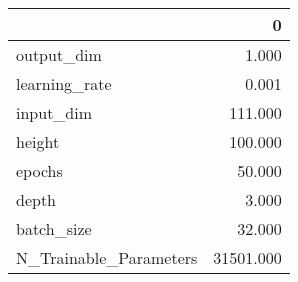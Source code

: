 \begin{tabular}{lr}
\toprule
{} &          0 \\
\midrule
output\_dim             &      1.000 \\
learning\_rate          &      0.001 \\
input\_dim              &    111.000 \\
height                 &    100.000 \\
epochs                 &     50.000 \\
depth                  &      3.000 \\
batch\_size             &     32.000 \\
N\_Trainable\_Parameters &  31501.000 \\
\bottomrule
\end{tabular}

